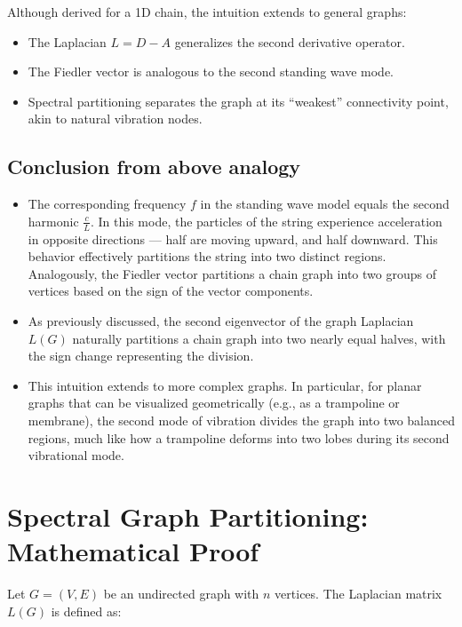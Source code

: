 \documentclass[hidelinks,12pt]{article}
\begin{document}
Although derived for a 1D chain, the intuition extends to general graphs:
\begin{itemize}
    \item The Laplacian \( L = D - A \) generalizes the second derivative operator.
    \item The Fiedler vector is analogous to the second standing wave mode.
    \item Spectral partitioning separates the graph at its “weakest” connectivity point, akin to natural vibration nodes.
\end{itemize}

\subsection*{Conclusion from above analogy}

\begin{itemize}
    \item The corresponding frequency \( f \) in the standing wave model equals the second harmonic \( \frac{c}{L} \). In this mode, the particles of the string experience acceleration in opposite directions — half are moving upward, and half downward. This behavior effectively partitions the string into two distinct regions. Analogously, the Fiedler vector partitions a chain graph into two groups of vertices based on the sign of the vector components.

    \item As previously discussed, the second eigenvector of the graph Laplacian \( L(G) \) naturally partitions a chain graph into two nearly equal halves, with the sign change representing the division.

    \item This intuition extends to more complex graphs. In particular, for planar graphs that can be visualized geometrically (e.g., as a trampoline or membrane), the second mode of vibration divides the graph into two balanced regions, much like how a trampoline deforms into two lobes during its second vibrational mode.
\end{itemize}
\newpage
\section{Spectral Graph Partitioning: Mathematical Proof}

Let \( G = (V, E) \) be an undirected graph with \( n \) vertices. The Laplacian matrix \( L(G) \) is defined as:
\end{document}
